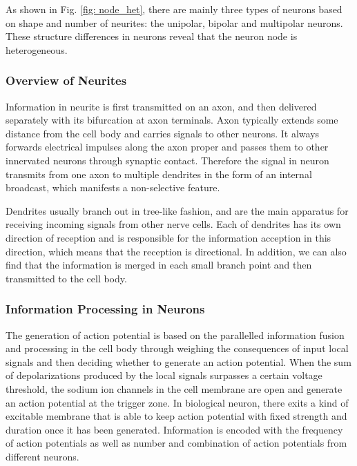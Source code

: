 \documentclass[journal,comsoc]{IEEEtran}
\begin{document}
	As shown in Fig. \ref{fig: node_het}, there are mainly three types of neurons based on shape and number of neurites: the unipolar, bipolar and multipolar neurons\cite{bear2007neuroscience}. 
	These structure differences in neurons reveal that the neuron node is heterogeneous.
	
	\subsubsection{Overview of Neurites}
	Information in neurite is first transmitted on an axon, and then delivered separately with its bifurcation at axon terminals. 
	Axon typically extends some distance from the cell body and carries signals to other neurons.
	It always forwards electrical impulses along the axon proper and passes them to other innervated neurons through synaptic contact. 
	Therefore the signal in neuron transmits from one axon to multiple dendrites in the form of an internal broadcast, which manifests a non-selective feature.
	
	Dendrites usually branch out in tree-like fashion, and are the main apparatus for receiving incoming signals from other nerve cells. 
	Each of dendrites has its own direction of reception and is responsible for the information acception in this direction, 
	which means that the reception is directional. 
	In addition, we can also find that the information is merged in each small branch point and then transmitted to the cell body.			
	
	\subsubsection{Information Processing in Neurons}
	The generation of action potential is based on the parallelled information fusion and processing in the cell body through weighing the consequences of input local signals and then deciding whether to generate an action potential. 
	When the sum of depolarizations produced by the local signals surpasses a certain voltage threshold, the sodium ion channels in the cell membrane are open and generate an action potential at the trigger zone. 
	In biological neuron, there exits a kind of excitable membrane that is able to keep action potential with fixed strength and duration once it has been generated.
	Information is encoded with the frequency of action potentials as well as number and combination of action potentials from different neurons\cite{bear2007neuroscience}. 
	
\end{document}
